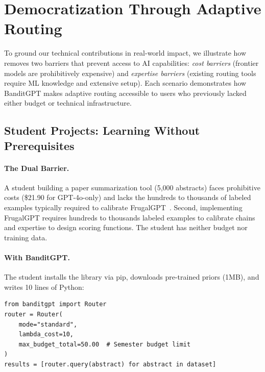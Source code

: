
\section{Democratization Through Adaptive Routing}
\label{sec:use_cases}

To ground our technical contributions in real-world impact, we illustrate how \ours{} removes two barriers that prevent access to AI capabilities: \emph{cost barriers} (frontier models are prohibitively expensive) and \emph{expertise barriers} (existing routing tools require ML knowledge and extensive setup). Each scenario demonstrates how BanditGPT makes adaptive routing accessible to users who previously lacked either budget or technical infrastructure.

\subsection{Student Projects: Learning Without Prerequisites}

\paragraph{The Dual Barrier.} A student building a paper summarization tool (5,000 abstracts) faces prohibitive costs (\$21.90 for GPT-4o-only) and lacks the hundreds to thousands of labeled examples typically required to calibrate FrugalGPT~\cite{chen2023frugalgpt}.
 Second, implementing FrugalGPT requires hundreds to thousands labeled examples to calibrate chains and expertise to design scoring functions. The student has neither budget nor training data.

\paragraph{With BanditGPT.} The student installs the library via pip, downloads pre-trained priors (1MB), and writes 10 lines of Python:

\begin{small}
\begin{verbatim}
from banditgpt import Router
router = Router(
    mode="standard", 
    lambda_cost=10,
    max_budget_total=50.00  # Semester budget limit
)
results = [router.query(abstract) for abstract in dataset]
\end{verbatim}
\end{small}

